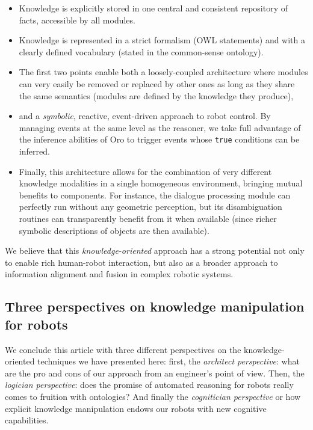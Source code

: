 \documentclass[letterpaper, 10 pt, conference]{ieeeconf}  %
\begin{document}
\begin{itemize}
    
    \item{Knowledge is explicitly stored in one central and consistent
    repository of facts, accessible by all modules.} 

    \item{Knowledge is represented in a strict formalism (OWL statements) and
    with a clearly defined vocabulary (stated in the common-sense ontology).}

    \item{The first two points enable both a loosely-coupled architecture where
    modules can very easily be removed or replaced by other ones as long as
    they share the same semantics (modules are defined by the knowledge they
    produce),} 

    \item{and a \emph{symbolic}, reactive, event-driven approach to robot control.
    By managing events at the same level as the reasoner, we take full
    advantage of the inference abilities of {\sc Oro} to trigger events whose
    \texttt{true} conditions can be inferred.} 

    \item{Finally, this architecture allows for the combination of very
    different knowledge modalities in a single homogeneous environment,
    bringing mutual benefits to components. For instance, the dialogue
    processing module can perfectly run without any geometric
    perception, but its disambiguation routines can transparently
    benefit from it when available (since richer symbolic descriptions of
    objects are then available).}

\end{itemize}

We believe that this \emph{knowledge-oriented} approach has a strong potential
not only to enable rich human-robot interaction, but also as a broader approach
to information alignment and fusion in complex robotic systems.

\subsection{Three perspectives on knowledge manipulation for robots}

We conclude this article with three different perspectives on the knowledge-oriented
techniques we have presented here: first, the \emph{architect perspective}:
what are the pro and cons of our approach from an engineer's point of view. Then,
the \emph{logician perspective}: does the promise of automated reasoning for
robots really comes to fruition with ontologies? And finally the
\emph{cognitician perspective} or how explicit knowledge manipulation endows
our robots with new cognitive capabilities.
\end{document}
